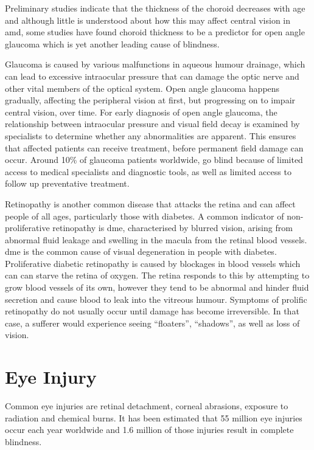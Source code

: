 Preliminary studies indicate that the thickness of the choroid
decreases with age and although little is understood about how
this may affect central vision in \acrshort{amd}, some studies
have found choroid thickness to be a predictor for open angle
glaucoma which is yet another leading cause of
blindness.\cite{margolis2009pilot,gordon2002ocular}

Glaucoma is caused by various malfunctions in aqueous
humour drainage, which can lead to excessive intraocular pressure
that can damage the optic nerve and other vital members of the
optical system.\cite{distelhorst2003open} Open angle glaucoma
happens gradually, affecting the peripheral vision at first, but
progressing on to impair central vision, over time. For early diagnosis
of open angle glaucoma, the relationship between intraocular pressure
and visual field decay is examined by specialists to determine whether
any abnormalities are apparent. This ensures that affected patients
can receive treatment, before permanent field damage can occur.
\cite{goldmann1972open} Around 10\% of glaucoma patients worldwide,
go blind because of limited access to medical specialists and diagnostic
tools, as well as limited access to follow up preventative treatment.
\cite{west2000looking}

Retinopathy is another common disease that attacks the retina and
can affect people of all ages, particularly those with diabetes.\cite{klein1984wisconsin} A
common indicator of non-proliferative retinopathy is \Gls{dme},
characterised by blurred vision, arising from abnormal fluid leakage
and swelling in the macula from the retinal blood vessels.
\cite{hee1995quantitative} \gls{dme} is the common cause of
visual degeneration in people with diabetes.\cite{klein1984wisconsin}
Proliferative diabetic retinopathy is caused by blockages in blood vessels
which can can starve the retina of oxygen. The retina responds to this by
attempting to grow blood vessels of its own, however they tend to be
abnormal and hinder fluid secretion and cause blood to leak into the
vitreous humour. Symptoms of prolific retinopathy do not usually occur
until damage has become irreversible. In that case, a sufferer would
experience seeing \enquote{floaters}, \enquote{shadows}, as well as
loss of vision.

\section{Eye Injury}

Common eye injuries are retinal detachment, corneal abrasions, exposure to
radiation and chemical burns. It has been estimated that 55 million eye injuries
occur each year worldwide and 1.6 million of those injuries result in complete
blindness.\cite{negrel1998global}

